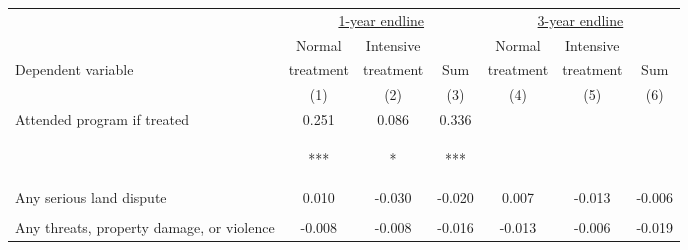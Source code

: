 \begin{tabular}{lcccccc}
\hline \noalign{\smallskip} & \multicolumn{3}{c}{\uline{\hfill 1-year endline \hfill}} & \multicolumn{3}{c}{\uline{\hfill 3-year endline \hfill}}\\
 & Normal & Intensive &  & Normal & Intensive & \\
Dependent variable & treatment & treatment & Sum & treatment & treatment & Sum\\
 & (1) & (2) & (3) & (4) & (5) & (6)\\
\noalign{\smallskip}\hline \noalign{\smallskip}Attended program if treated & 0.251 & 0.086 & 0.336 &  &  & \\
 & \begin{footnotesize}[0.023]***\end{footnotesize} & \begin{footnotesize}[0.045]*\end{footnotesize} & \begin{footnotesize}[0.040]***\end{footnotesize} & \begin{footnotesize}\end{footnotesize} & \begin{footnotesize}\end{footnotesize} & \begin{footnotesize}\end{footnotesize}\\
\noalign{\smallskip}Any serious land dispute & 0.010 & -0.030 & -0.020 & 0.007 & -0.013 & -0.006\\
 & \begin{footnotesize}[0.018]\end{footnotesize} & \begin{footnotesize}[0.030]\end{footnotesize} & \begin{footnotesize}[0.028]\end{footnotesize} & \begin{footnotesize}[0.012]\end{footnotesize} & \begin{footnotesize}[0.016]\end{footnotesize} & \begin{footnotesize}[0.014]\end{footnotesize}\\
\noalign{\smallskip}Any threats, property damage, or violence & -0.008 & -0.008 & -0.016 & -0.013 & -0.006 & -0.019\\

\end{tabular}
